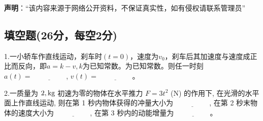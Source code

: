 
\textbf{声明}：“该内容来源于网络公开资料，不保证真实性，如有侵权请联系管理员”

\subsection{填空题(26分，每空2分)}
1.一小轿车作直线运动，刹车时$(t=0)$，速度为$v_0$，刹车后其加速度与速度成正比而反向，即$a=k-v,k$为已知常数。为已知常数。则任一时刻 $a(t) = \underline{\hspace{2cm}}$, $v(t) = \underline{\hspace{2cm}}$。

2.一质量为 $2 \\, \text{kg}$ 初速为零的物体在水平推力 $F = 3t^2$ (N) 的作用下, 在光滑的水平面上作直线运动, 则在第 1 秒内物体获得的冲量大小为 $\underline{\hspace{2cm}}$, 在第 2 秒末物体的速度大小为 $\underline{\hspace{2cm}}$, 在第 3 秒内的动能增量为 $\underline{\hspace{2cm}}$。